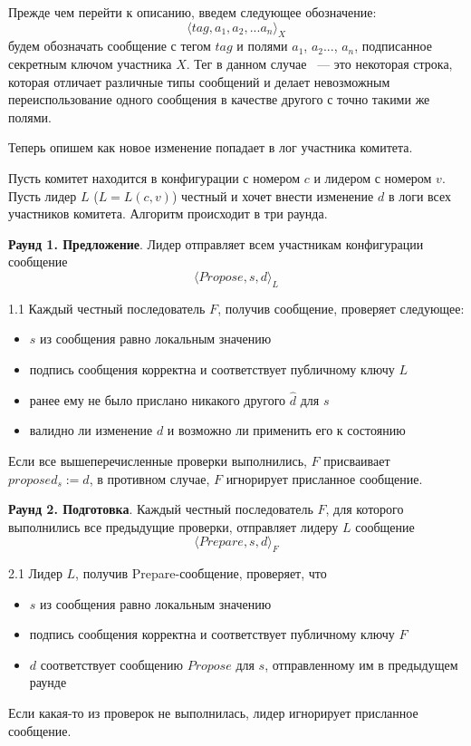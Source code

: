 Прежде чем перейти к описанию, введем следующее обозначение:
\[ \langle tag, a_1, a_2, ... a_n \rangle_X \] будем обозначать сообщение с тегом $tag$ и полями $a_1$, $a_2$..., $a_n$, подписанное секретным ключом участника $X$. Тег в данном случае ~--- это некоторая строка, которая отличает различные типы сообщений и делает невозможным переиспользование одного сообщения в качестве другого с точно такими же полями.

Теперь опишем как новое изменение попадает в лог участника комитета.

Пусть комитет находится в конфигурации с номером $c$ и лидером с номером $v$. 
Пусть лидер $L$ ($L = L(c, v)$) честный и хочет внести изменение $d$ в логи всех участников комитета. Алгоритм происходит в три раунда.

\textbf{Раунд 1. Предложение}. Лидер отправляет всем участникам конфигурации сообщение 
\[ \langle Propose, s, d \rangle_L \]

1.1 Каждый честный последователь $F$, получив сообщение, проверяет следующее:
\begin{itemize}
\item $s$ из сообщения равно локальным значению
\item подпись сообщения корректна и соответствует публичному ключу $L$
\item ранее ему не было прислано никакого другого $\hat d$ для $s$
\item валидно ли изменение $d$ и возможно ли применить его к состоянию
\end{itemize}

Если все вышеперечисленные проверки выполнились, $F$ присваивает $proposed_s := d$, в противном случае, $F$ игнорирует присланное сообщение. 
\vspace{10pt}

\textbf{Раунд 2. Подготовка}. Каждый честный последователь $F$, для которого выполнились все предыдущие проверки, отправляет лидеру $L$ сообщение 
\[ \langle Prepare, s, d \rangle_F \]

2.1 Лидер $L$, получив Prepare-сообщение, проверяет, что
\begin{itemize}
\item $s$ из сообщения равно локальным значению
\item подпись сообщения корректна и соответствует публичному ключу $F$
\item $d$ соответствует сообщению $Propose$ для $s$, отправленному им в предыдущем раунде
\end{itemize}
Если какая-то из проверок не выполнилась, лидер игнорирует присланное сообщение. 


